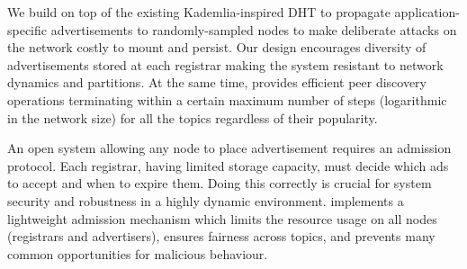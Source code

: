 We build \sysname on top of the existing Kademlia-inspired DHT to propagate application-specific advertisements to randomly-sampled nodes to make deliberate attacks on the network costly to mount and persist. Our design encourages diversity of advertisements stored at each registrar making the system resistant to network dynamics and partitions. At the same time, \sysname provides efficient peer discovery operations terminating within a certain maximum number of steps (logarithmic in the network size) for all the topics regardless of their popularity. 

 

An open system allowing any node to place advertisement requires an admission protocol.  Each registrar, having limited storage capacity, must decide which ads to accept and when to expire them. Doing this correctly is crucial for system security and robustness in a highly dynamic environment. \sysname implements a lightweight admission mechanism which limits the resource usage on all nodes (registrars and advertisers), ensures fairness across topics, and prevents many common opportunities for malicious behaviour.

